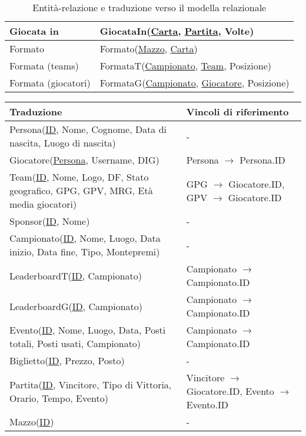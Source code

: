 \documentclass{article}
\begin{document}
\begin{table}
\begin{tabularx}{\textwidth}{|l|X|}
        Giocata in & GiocataIn(\underline{Carta}, \underline{Partita}, Volte) \\ \hline
        Formato & Formato(\underline{Mazzo}, \underline{Carta}) \\ \hline
        Formata (teams) & FormataT(\underline{Campionato}, \underline{Team}, Posizione) \\ \hline
        Formata (giocatori) & FormataG(\underline{Campionato}, \underline{Giocatore}, Posizione) \\ \hline
    \end{tabularx}
    \caption{Entità-relazione e traduzione verso il modella relazionale}
    \label{table_entita_relazione_traduzione}
\end{table}

\begin{table}
    \centering
    \begin{tabularx}{\textwidth}{|X|X|}
        \hline
        \textbf{Traduzione} & \textbf{Vincoli di riferimento} \\ \hline
        Persona(\underline{ID}, Nome, Cognome, Data di nascita, Luogo di nascita) & - \\ \hline
        Giocatore(\underline{Persona}, Username, DIG) & Persona $\xrightarrow{}$ Persona.ID \\ \hline
        Team(\underline{ID}, Nome, Logo, DF, Stato geografico, GPG, GPV, MRG, Età media giocatori) & GPG $\xrightarrow{}$ Giocatore.ID, GPV $\xrightarrow{}$ Giocatore.ID \\ \hline
        Sponsor(\underline{ID}, Nome) & - \\ \hline
        Campionato(\underline{ID}, Nome, Luogo, Data inizio, Data fine, Tipo, Montepremi) & - \\ \hline
        LeaderboardT(\underline{ID}, Campionato) & Campionato $\xrightarrow{}$ Campionato.ID \\ \hline
        LeaderboardG(\underline{ID}, Campionato) & Campionato $\xrightarrow{}$ Campionato.ID \\ \hline
        Evento(\underline{ID}, Nome, Luogo, Data, Posti totali, Posti usati, Campionato) & Campionato $\xrightarrow{}$ Campionato.ID \\ \hline
        Biglietto(\underline{ID}, Prezzo, Posto) & - \\ \hline
        Partita(\underline{ID}, Vincitore, Tipo di Vittoria, Orario, Tempo, Evento) & Vincitore $\xrightarrow{}$ Giocatore.ID, Evento $\xrightarrow{}$ Evento.ID \\ \hline
        Mazzo(\underline{ID}) & - \\ \hline %

\end{tabularx}
\end{table}
\end{document}
